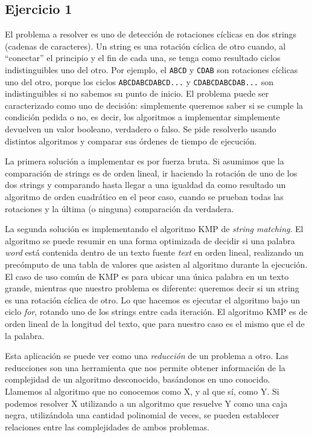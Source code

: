 \documentclass{article}
\begin{document}
\subsection{Ejercicio 1}
El problema a resolver es uno de detección de rotaciones cíclicas en dos strings (cadenas de caracteres). Un string es una rotación cíclica de otro cuando, al ``conectar'' el principio y el fin de cada una, se tenga como resultado ciclos indistinguibles uno del otro. Por ejemplo, el \texttt{ABCD} y \texttt{CDAB} son rotaciones cíclicas uno del otro, porque los ciclos \texttt{ABCDABCDABCD...} y \texttt{CDABCDABCDAB...} son indistinguibles si no sabemos su punto de inicio. El problema puede ser caracterizado como uno de decisión: simplemente queremos saber si se cumple la condición pedida o no, es decir, los algoritmos a implementar simplemente devuelven un valor booleano, verdadero o falso. Se pide resolverlo usando distintos algoritmos y comparar sus órdenes de tiempo de ejecución.

La primera solución a implementar es por fuerza bruta. Si asumimos que la comparación de strings es de orden lineal, ir haciendo la rotación de uno de los dos strings y comparando hasta llegar a una igualdad da como resultado un algoritmo de orden cuadrático en el peor caso, cuando se prueban todas las rotaciones y la última (o ninguna) comparación da verdadera.

La segunda solución es implementando el algoritmo KMP de \textit{string matching}. El algoritmo se puede resumir en una forma optimizada de decidir si una palabra \textit{word} está contenida dentro de un texto fuente \textit{text} en orden lineal, realizando un precómputo de una tabla de valores que asisten al algoritmo durante la ejecución. El caso de uso común de KMP es para ubicar una única palabra en un texto grande, mientras que nuestro problema es diferente: queremos decir si un string es una rotación cíclica de otro. Lo que hacemos es ejecutar el algoritmo bajo un ciclo \textit{for}, rotando uno de los strings entre cada iteración. El algoritmo KMP es de orden lineal de la longitud del texto, que para nuestro caso es el mismo que el de la palabra.

Esta aplicación se puede ver como una \textit{reducción} de un problema a otro. Las reducciones son una herramienta que nos permite obtener información de la complejidad de un algoritmo desconocido, basándonos en uno conocido. Llamemos al algoritmo que no conocemos como X, y al que sí, como Y. Si podemos resolver X utilizando a un algoritmo que resuelve Y como una caja negra, utilizándola una cantidad polinomial de veces, se pueden establecer relaciones entre las complejidades de ambos problemas.
\end{document}
